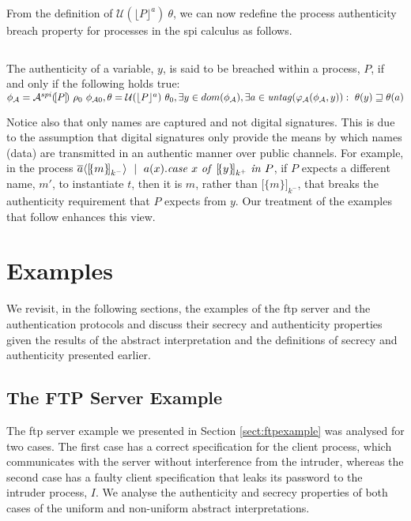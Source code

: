 \documentclass[10pt,a4paper,final,oneside,fleqn]{book}
\begin{document}
From the definition of $\mathcal{U}(\lfloor P\rfloor^a)~\theta$, we can now redefine the process authenticity breach property for processes in the spi calculus as follows.
\begin{prop}
$ $

\noindent
The authenticity of a variable, $y$, is said to be breached within a process, $P$, if and only if the following holds true:\\
$\phi_\mathcal{A}=\mathcal{A}^{spi}(\![P]\!)~\rho_0~\phi_{\mathcal{A}0},\theta=\mathcal{U}(\lfloor P\rfloor^a)~\theta_0,\exists y\in dom(\phi_\mathcal{A}),\exists a\in\mbox{{\itshape untag\/}}(\varphi_\mathcal{A}(\phi_\mathcal{A},y)):~\theta(y)\sqsupseteq\theta(a)$
\end{prop}
Notice also that only names are captured and not digital signatures.  This is due to the assumption that digital signatures only provide the means by which names (data) are transmitted in an authentic manner over public channels.  For example, in the process $\overline{a}\langle{[}\!\{m\}\!{]}_{k^-}\rangle~\mid~a(x).\mbox{{\itshape case\/} }x\mbox{ {\itshape of\/} }{[}\!\{y\}\!{]}_{k^+}\mbox{ {\itshape in\/} }P$, if $P$ expects a different name, $m'$, to instantiate $t$, then it is $m$, rather than ${[}\!\{m\}\!{]}_{k^-}$, that breaks the authenticity requirement that $P$ expects from $y$. Our treatment of the examples that follow enhances this view.
\section{Examples}
We revisit, in the following sections, the examples of the ftp server and the authentication protocols and discuss their secrecy and authenticity properties given the results of the abstract interpretation and the definitions of secrecy and authenticity presented earlier.
\subsection{The FTP Server Example}
The ftp server example we presented in Section \ref{sect:ftpexample} was analysed for two cases.  The first case has a correct specification for the client process, which communicates with the server without interference from the intruder, whereas the second case has a faulty client specification that leaks its password to the intruder process, $I$.  We analyse the authenticity and secrecy properties of both cases of the uniform and non-uniform abstract interpretations.
\end{document}
